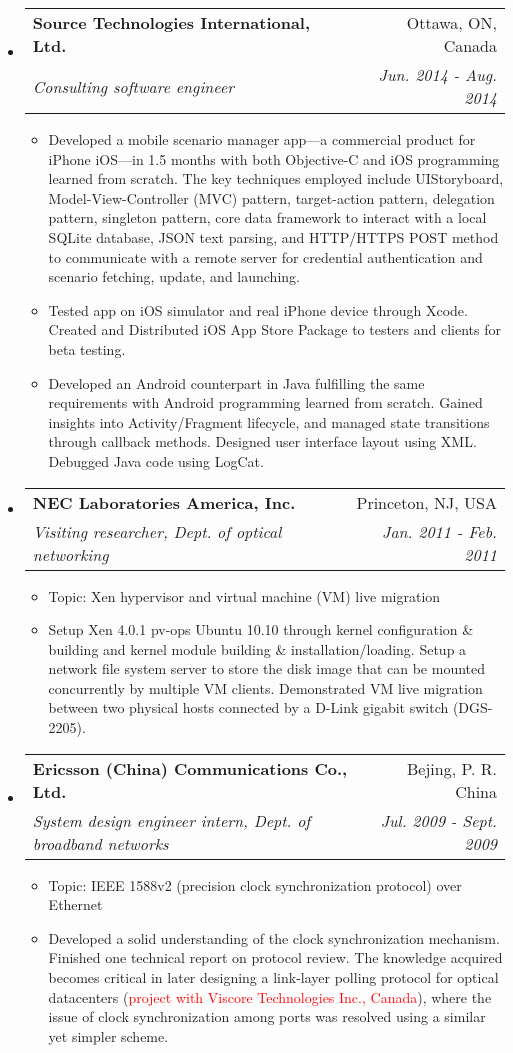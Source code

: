 \documentclass[letterpaper,11pt]{article}
\makeatletter
\newcommand{\ressubheading}[4]{
\begin{tabular*}{6.69in}{l@{\extracolsep{\fill}}r}
        \textbf{#1} & #2 \\
        \textit{#3} & \textit{#4} \\
\end{tabular*}\vspace{-6pt}
}
\newcommand{\resitem}[1]{\item #1 \vspace{-2pt}}
\makeatother
\begin{document}
\begin{CJK}{UTF8}{gbsn}
\begin{itemize}
\item
  \ressubheading{Source Technologies International, Ltd.}{Ottawa, ON, Canada}
  {Consulting software engineer}{Jun. 2014 - Aug. 2014}
  \begin{itemize}
    \resitem{Developed a mobile scenario manager app---a commercial product for iPhone iOS---in 1.5 months with both Objective-C and iOS programming learned from scratch.
    The key techniques employed include UIStoryboard, Model-View-Controller (MVC) pattern, target-action pattern, delegation pattern, singleton pattern,
    core data framework to interact with a local SQLite database, JSON text parsing,
    and HTTP/HTTPS POST method to communicate with a remote server for credential authentication and scenario fetching, update, and launching.}
    \resitem{Tested app on iOS simulator and real iPhone device through Xcode. Created and Distributed iOS App Store Package to testers and clients for beta testing.}
    \resitem{Developed an Android counterpart in Java fulfilling the same requirements with Android programming learned from scratch.
    Gained insights into Activity/Fragment lifecycle, and managed state transitions through callback methods.
    Designed user interface layout using XML. Debugged Java code using LogCat.}
  \end{itemize}

\item
    \ressubheading{NEC Laboratories America, Inc.}{Princeton, NJ, USA}%
    {Visiting researcher, Dept. of optical networking}{Jan. 2011 - Feb. 2011}
    \begin{itemize}
        \resitem{Topic: Xen hypervisor and virtual machine (VM) live migration}
        \resitem{Setup Xen 4.0.1 pv-ops Ubuntu 10.10 through kernel configuration \& building and kernel module building \& installation/loading.
        Setup a network file system server to store the disk image that can be mounted concurrently by multiple VM clients.
        Demonstrated VM live migration between two physical hosts connected by a D-Link gigabit switch (DGS-2205).}
    \end{itemize}

\item
    \ressubheading{Ericsson (China) Communications Co., Ltd.}{Bejing, P. R. China}%
    {System design engineer intern, Dept. of broadband networks}{Jul. 2009 - Sept. 2009}
    \begin{itemize}
        \resitem{Topic: IEEE 1588v2 (precision clock synchronization protocol) over Ethernet}
        \resitem{Developed a solid understanding of the clock synchronization mechanism. Finished one technical report on protocol review.
        The knowledge acquired becomes critical in later designing a link-layer polling protocol for optical datacenters (\textcolor{Red}{project with Viscore Technologies Inc., Canada}),
        where the issue of clock synchronization among ports was resolved using a similar yet simpler scheme.}
    \end{itemize}


\end{itemize}
\end{CJK}
\end{document}
